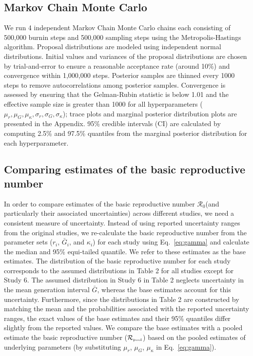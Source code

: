 \documentclass[12pt]{article}
\newcommand{\eref}[1]{Eq.~\ref{eq:#1}}
\newcommand{\Ro}{\ensuremath{{\mathcal R}_{0}}\xspace}
\newcommand{\Rpool}{\ensuremath{{\mathcal R}_{\textrm{\tiny{pool}}}}\xspace}
\begin{document}
\subsection{Markov Chain Monte Carlo}
\label{section:MCMC}

We run 4 independent Markov Chain Monte Carlo chains each consisting of 500,000 burnin steps and 500,000 sampling steps using the Metropolis-Hastings algorithm.
Proposal distributions are modeled using independent normal distributions.
Initial values and variances of the proposal distributions are chosen by trial-and-error to ensure a reasonable acceptance rate (around 10\%) and convergence within 1,000,000 steps.
Posterior samples are thinned every 1000 steps to remove autocorrelations among posterior samples.
Convergence is assessed by ensuring that the Gelman-Rubin statistic is below 1.01  \citep{gelman1992inference} and the effective sample size is greater than 1000 for all hyperparameters ($\mu_r, \mu_G, \mu_\kappa, \sigma_r, \sigma_G, \sigma_\kappa$);
trace plots and marginal posterior distribution plots are presented in the Appendix.
95\% credible intervals (CI) are calculated by computing 2.5\% and 97.5\% quantiles from the marginal posterior distribution for each hyperparameter.

\subsection{Comparing estimates of the basic reproductive number}

In order to compare estimates of the basic reproductive number \Ro (and particularly their associated uncertainties) across different studies, we need a consistent measure of uncertainty.
Instead of using reported uncertainty ranges from the original studies, we re-calculate the basic reproductive number from the parameter sets ($r_i$, $\bar G_i$, and $\kappa_i$) for each study using \eref{gamma} and calculate the median and 95\% equi-tailed quantile.
We refer to these estimates as the base estimates.
The distribution of the basic reproductive number for each study corresponds to the assumed distributions in Table 2 for all studies except for Study 6.
The assumed distribution in Study 6 in Table 2 neglects uncertainty in the mean generation interval $\bar G$, whereas the base estimates account for this uncertainty.
Furthermore, since the distributions in Table 2 are constructed by matching the mean and the probabilities associated with the reported uncertainty ranges, the exact values of the base estimates and their 95\% quantiles differ slightly from the reported values.
We compare the base estimates with a pooled estimate the basic reproductive number (\Rpool) based on the pooled estimates of underlying parameters (by substituting $\mu_r$, $\mu_G$, $\mu_\kappa$ in \eref{gamma}). 
\end{document}
